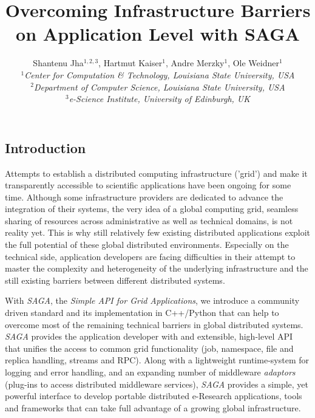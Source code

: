 \documentclass[a4paper,10pt]{article}
\newcommand{\sagaimpl}{\textit{SAGA}\xspace}
\newcommand{\impl}{\sagaimpl}
\newcommand{\jhanote}[1]{  {\textcolor{red}     { ***Shantenu: #1 }}}
\newcommand{\jhanote}[1]{}
\begin{document}
 \title{ \Large \vspace{-3.5em} Overcoming Infrastructure Barriers on Application Level with SAGA }
 
 \author{Shantenu Jha$^{1,2,3}$, Hartmut Kaiser$^{1}$, Andre Merzky$^{1}$, Ole Weidner$^{1}$ \\
   \small{\emph{$^{1}$Center for Computation \& Technology, Louisiana State University, USA}}\\
   \small{\emph{$^{2}$Department of Computer Science, Louisiana State University, USA}}\\
   \small{\emph{$^{3}$e-Science Institute, University of Edinburgh, UK}}
 }
 \date{}
 \maketitle
 




\subsection*{Introduction}
\vspace{-0.5em}

 Attempts to establish a distributed computing infrastructure ('grid')
 and make it transparently accessible to scientific applications have
 been ongoing for some time. Although some infrastructure providers
 are dedicated to advance the integration of their systems, the very
 idea of a global computing grid, seamless sharing of resources across
 administrative as well as technical domains, is not reality yet. This
 is why still relatively few existing distributed applications exploit
 the full potential of these global distributed environments.
 Especially on the technical side, application developers are facing
 difficulties in their attempt to master the complexity and
 heterogeneity of the underlying infrastructure and the still existing
 barriers between different distributed systems.

 With \impl, the \textit{Simple API for Grid Applications}, we
 introduce a community driven standard and its implementation in
 C++/Python that can help to overcome most of the remaining technical
 barriers in global distributed systems. \impl provides the
 application developer with and extensible, high-level API that
 unifies the access to common grid functionality (job, namespace, file
 and replica handling, streams and RPC). Along with a lightweight
 runtime-system for logging and error handling, and an expanding
 number of middleware \textit{adaptors} (plug-ins to access
 distributed middleware services), \impl provides a simple, yet
 powerful interface to develop portable distributed e-Research applications,
 tools and frameworks that can take full advantage of a growing global
 infrastructure.
\end{document}

